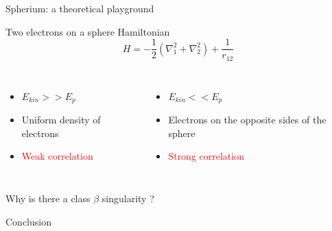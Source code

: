 \documentclass[xcolor=x11names,compress]{beamer}
\renewcommand{\(}{\begin{columns}}
\renewcommand{\)}{\end{columns}}
\newcommand{\<}[1]{\begin{column}{#1}}
\renewcommand{\>}{\end{column}}
\begin{document}
\begin{frame}{Spherium: a theoretical playground}

\begin{beamerboxesrounded}[scheme=foncé]{\centering Two electrons on a sphere Hamiltonian}
\begin{equation*}
    H=-\frac{1}{2}(\nabla_1^2 + \nabla_2^2) + \frac{1}{r_{12}}
\end{equation*} 
\end{beamerboxesrounded}
\vspace{0.5cm}

\begin{columns}


\vspace{0.5cm}

\begin{itemize}
    \item $E_{kin} >> E_p$
    \item Uniform density of electrons
    \item \textcolor{red}{Weak correlation}
\end{itemize}

\vspace{0.5cm}


\vspace{0.5cm}

\begin{itemize}
    \item $E_{kin} << E_p$
    \item Electrons on the opposite sides of the sphere
    \item \textcolor{red}{Strong correlation}
    \end{itemize}

\end{columns}

\end{frame}

\begin{frame}{Why is there a class $\beta$ singularity ?}
    
\end{frame}

\begin{frame}{Conclusion}
    
\end{frame}
\end{document}
